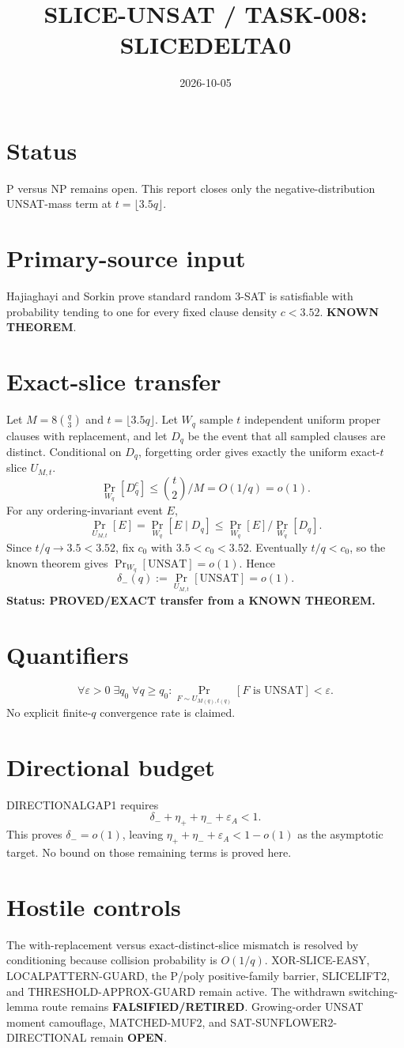 \documentclass[11pt]{article}
\title{SLICE-UNSAT / TASK-008: SLICEDELTA0}
\date{2026-10-05}
\begin{document}
\maketitle
\section*{Status}
P versus NP remains open. This report closes only the negative-distribution UNSAT-mass term at $t=\lfloor3.5q\rfloor$.
\section*{Primary-source input}
Hajiaghayi and Sorkin prove standard random 3-SAT is satisfiable with probability tending to one for every fixed clause density $c<3.52$. \textbf{KNOWN THEOREM}.
\section*{Exact-slice transfer}
Let $M=8\binom q3$ and $t=\lfloor3.5q\rfloor$. Let $W_q$ sample $t$ independent uniform proper clauses with replacement, and let $D_q$ be the event that all sampled clauses are distinct. Conditional on $D_q$, forgetting order gives exactly the uniform exact-$t$ slice $U_{M,t}$.
\[
\Pr_{W_q}[D_q^c]\le \binom t2/M=O(1/q)=o(1).
\]
For any ordering-invariant event $E$,
\[
\Pr_{U_{M,t}}[E]=\Pr_{W_q}[E\mid D_q]\le \Pr_{W_q}[E]/\Pr_{W_q}[D_q].
\]
Since $t/q\to3.5<3.52$, fix $c_0$ with $3.5<c_0<3.52$. Eventually $t/q<c_0$, so the known theorem gives $\Pr_{W_q}[\mathrm{UNSAT}]=o(1)$. Hence
\[
\boxed{\delta_-(q):=\Pr_{U_{M,t}}[\mathrm{UNSAT}]=o(1).}
\]
\textbf{Status: PROVED/EXACT transfer from a KNOWN THEOREM.}
\section*{Quantifiers}
\[
\forall\varepsilon>0\;\exists q_0\;\forall q\ge q_0:
\Pr_{F\sim U_{M(q),t(q)}}[F\text{ is UNSAT}]<\varepsilon.
\]
No explicit finite-$q$ convergence rate is claimed.
\section*{Directional budget}
DIRECTIONALGAP1 requires
\[
\delta_-+\eta_++\eta_-+\varepsilon_A<1.
\]
This proves $\delta_-=o(1)$, leaving $\eta_++\eta_-+\varepsilon_A<1-o(1)$ as the asymptotic target. No bound on those remaining terms is proved here.
\section*{Hostile controls}
The with-replacement versus exact-distinct-slice mismatch is resolved by conditioning because collision probability is $O(1/q)$. XOR-SLICE-EASY, LOCALPATTERN-GUARD, the P/poly positive-family barrier, SLICELIFT2, and THRESHOLD-APPROX-GUARD remain active. The withdrawn switching-lemma route remains \textbf{FALSIFIED/RETIRED}. Growing-order UNSAT moment camouflage, MATCHED-MUF2, and SAT-SUNFLOWER2-DIRECTIONAL remain \textbf{OPEN}.
\end{document}
